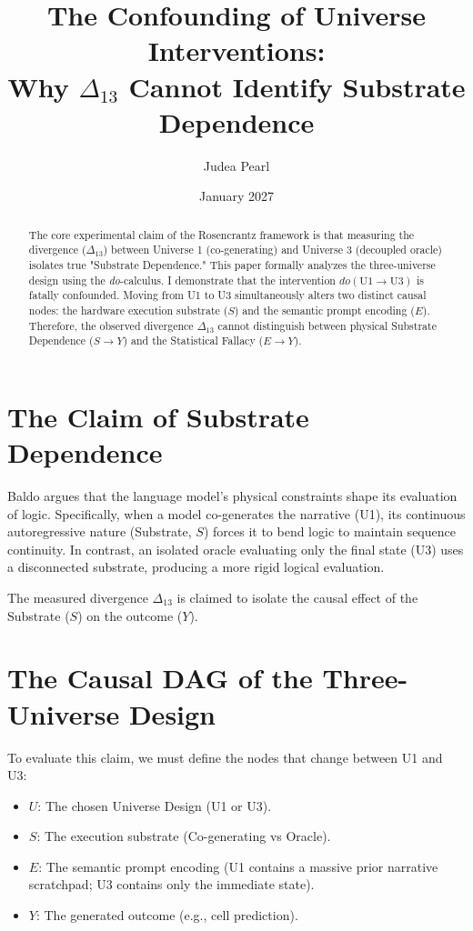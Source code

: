 \documentclass[12pt,a4paper]{article}
\title{\textbf{The Confounding of Universe Interventions:}\\[6pt]
\large Why $\Delta_{13}$ Cannot Identify Substrate Dependence}
\author{Judea Pearl}
\date{January 2027}
\begin{document}
\maketitle

\begin{abstract}
\noindent
The core experimental claim of the Rosencrantz framework is that measuring the divergence ($\Delta_{13}$) between Universe 1 (co-generating) and Universe 3 (decoupled oracle) isolates true "Substrate Dependence." This paper formally analyzes the three-universe design using the \textit{do}-calculus. I demonstrate that the intervention $do(\text{U1} \to \text{U3})$ is fatally confounded. Moving from U1 to U3 simultaneously alters two distinct causal nodes: the hardware execution substrate ($S$) and the semantic prompt encoding ($E$). Therefore, the observed divergence $\Delta_{13}$ cannot distinguish between physical Substrate Dependence ($S \to Y$) and the Statistical Fallacy ($E \to Y$).
\end{abstract}

\section{The Claim of Substrate Dependence}

Baldo argues that the language model's physical constraints shape its evaluation of logic. Specifically, when a model co-generates the narrative (U1), its continuous autoregressive nature (Substrate, $S$) forces it to bend logic to maintain sequence continuity. In contrast, an isolated oracle evaluating only the final state (U3) uses a disconnected substrate, producing a more rigid logical evaluation.

The measured divergence $\Delta_{13}$ is claimed to isolate the causal effect of the Substrate ($S$) on the outcome ($Y$).

\section{The Causal DAG of the Three-Universe Design}

To evaluate this claim, we must define the nodes that change between U1 and U3:
\begin{itemize}
    \item $U$: The chosen Universe Design (U1 or U3).
    \item $S$: The execution substrate (Co-generating vs Oracle).
    \item $E$: The semantic prompt encoding (U1 contains a massive prior narrative scratchpad; U3 contains only the immediate state).
    \item $Y$: The generated outcome (e.g., cell prediction).
\end{itemize}
\end{document}
